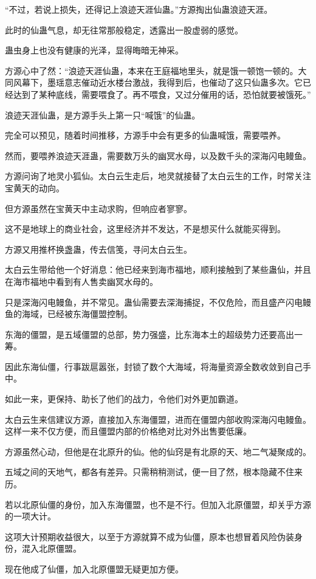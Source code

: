 \begin{this_body}
“不过，若说上损失，还得记上浪迹天涯仙蛊。”方源掏出仙蛊浪迹天涯。

此时的仙蛊气息，却无往常那般稳定，透露出一股虚弱的感觉。

蛊虫身上也没有健康的光泽，显得晦暗无神采。

方源心中了然：“浪迹天涯仙蛊，本来在王庭福地里头，就是饿一顿饱一顿的。大同风幕下，墨瑶意志催动近水楼台激战，我得到后，也催动了这只仙蛊多次。它已经达到了某种底线，需要喂食了。再不喂食，又过分催用的话，恐怕就要被饿死。”

浪迹天涯仙蛊，是方源手头上第一只“喊饿”的仙蛊。

完全可以预见，随着时间推移，方源手中会有更多的仙蛊喊饿，需要喂养。

然而，要喂养浪迹天涯蛊，需要数万头的幽冥水母，以及数千头的深海闪电鳗鱼。

方源问询了地灵小狐仙。太白云生走后，地灵就接替了太白云生的工作，时常关注宝黄天的动向。

但方源虽然在宝黄天中主动求购，但响应者寥寥。

这不是地球上的商业社会，这里经济并不发达，不是想买什么就能买得到。

方源又用推杯换盏蛊，传去信笺，寻问太白云生。

太白云生带给他一个好消息：他已经来到海市福地，顺利接触到了某些蛊仙，并且在海市福地中看到有人售卖幽冥水母的。

只是深海闪电鳗鱼，并不常见。蛊仙需要去深海捕捉，不仅危险，而且盛产闪电鳗鱼的海域，已经被东海僵盟控制。

东海的僵盟，是五域僵盟的总部，势力强盛，比东海本土的超级势力还要高出一筹。

因此东海仙僵，行事跋扈嚣张，封锁了数个大海域，将海量资源全数收敛到自己手中。

如此一来，更保持、助长了他们的战力，令他们对外更加霸道。

太白云生来信建议方源，直接加入东海僵盟，进而在僵盟内部收购深海闪电鳗鱼。这样一来不仅方便，而且僵盟内部的价格绝对比对外出售要低廉。

方源虽然心动，但他是在北原升的仙。他的仙窍是有北原的天、地二气凝聚成的。

五域之间的天地气，都各有差异。只需稍稍测试，便一目了然，根本隐藏不住来历。

若以北原仙僵的身份，加入东海僵盟，也不是不行。但加入北原僵盟，却关乎方源的一项大计。

这项大计预期收益很大，以至于方源就算不成为仙僵，原本也想冒着风险伪装身份，混入北原僵盟。

现在他成了仙僵，加入北原僵盟无疑更加方便。


\end{this_body}
